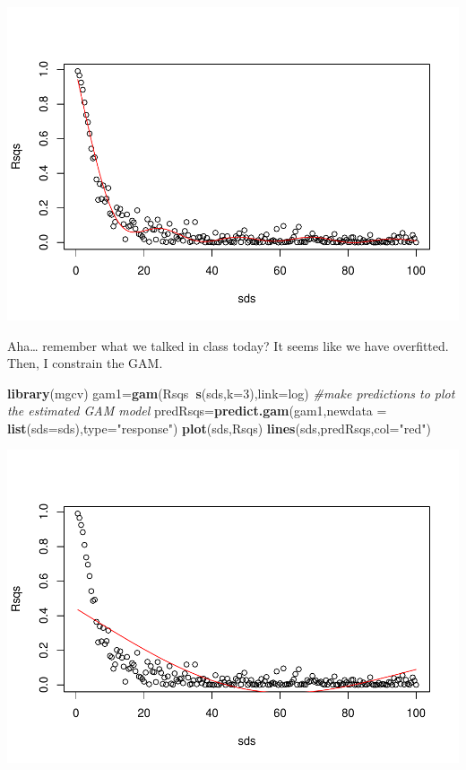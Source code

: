\documentclass[
]{book}
\newenvironment{Shaded}{\begin{snugshade}}{\end{snugshade}}
\newcommand{\CommentTok}[1]{\textcolor[rgb]{0.56,0.35,0.01}{\textit{#1}}}
\newcommand{\DataTypeTok}[1]{\textcolor[rgb]{0.13,0.29,0.53}{#1}}
\newcommand{\DecValTok}[1]{\textcolor[rgb]{0.00,0.00,0.81}{#1}}
\newcommand{\KeywordTok}[1]{\textcolor[rgb]{0.13,0.29,0.53}{\textbf{#1}}}
\newcommand{\NormalTok}[1]{#1}
\newcommand{\OperatorTok}[1]{\textcolor[rgb]{0.81,0.36,0.00}{\textbf{#1}}}
\newcommand{\StringTok}[1]{\textcolor[rgb]{0.31,0.60,0.02}{#1}}
\begin{document}
\includegraphics{ECOMODbook_files/figure-latex/a6.32-1.pdf}

Aha\ldots{} remember what we talked in class today? It seems like we have overfitted. Then, I constrain the GAM.

\begin{Shaded}
\begin{Highlighting}[]
\KeywordTok{library}\NormalTok{(mgcv)}
\NormalTok{gam1=}\KeywordTok{gam}\NormalTok{(Rsqs}\OperatorTok{~}\KeywordTok{s}\NormalTok{(sds,}\DataTypeTok{k=}\DecValTok{3}\NormalTok{),}\DataTypeTok{link=}\NormalTok{log)}
\CommentTok{#make predictions to plot the estimated GAM model}
\NormalTok{predRsqs=}\KeywordTok{predict.gam}\NormalTok{(gam1,}\DataTypeTok{newdata =} \KeywordTok{list}\NormalTok{(}\DataTypeTok{sds=}\NormalTok{sds),}\DataTypeTok{type=}\StringTok{"response"}\NormalTok{)}
\KeywordTok{plot}\NormalTok{(sds,Rsqs)}
\KeywordTok{lines}\NormalTok{(sds,predRsqs,}\DataTypeTok{col=}\StringTok{"red"}\NormalTok{)}
\end{Highlighting}
\end{Shaded}

\includegraphics{ECOMODbook_files/figure-latex/a6.33-1.pdf}
\end{document}
